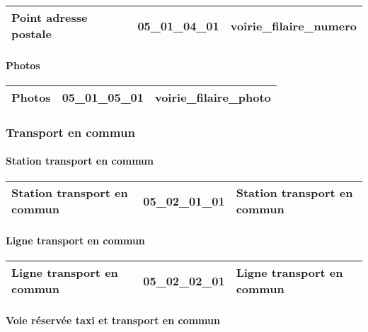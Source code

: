\documentclass[12pt,titlepage]{book}
\begin{document}
\renewcommand{\arraystretch}{1.2}
\begin{supertabular}{|p{10cm}|c|p{15cm}|}
 Point adresse postale & 05\_01\_04\_01 & voirie\_filaire\_numero\\
\hline
\end{supertabular}


\paragraph{Photos}
\noindent
\vspace{\baselineskip}

\renewcommand{\arraystretch}{1.2}
\begin{supertabular}{|p{10cm}|c|p{15cm}|}
 Photos & 05\_01\_05\_01 & voirie\_filaire\_photo\\
\hline
\end{supertabular}

\subsubsection{\large Transport en commun}
\paragraph{Station transport en commun}
\noindent
\vspace{\baselineskip}

\renewcommand{\arraystretch}{1.2}
\begin{supertabular}{|p{10cm}|c|p{15cm}|}
 Station transport en commun & 05\_02\_01\_01 & Station transport en commun\\
\hline
\end{supertabular}


\paragraph{Ligne transport en commun}
\noindent
\vspace{\baselineskip}

\renewcommand{\arraystretch}{1.2}
\begin{supertabular}{|p{10cm}|c|p{15cm}|}
 Ligne transport en commun & 05\_02\_02\_01 & Ligne transport en commun\\
\hline
\end{supertabular}


\paragraph{Voie réservée taxi et transport en commun}
\noindent
\vspace{\baselineskip}
\end{document}
